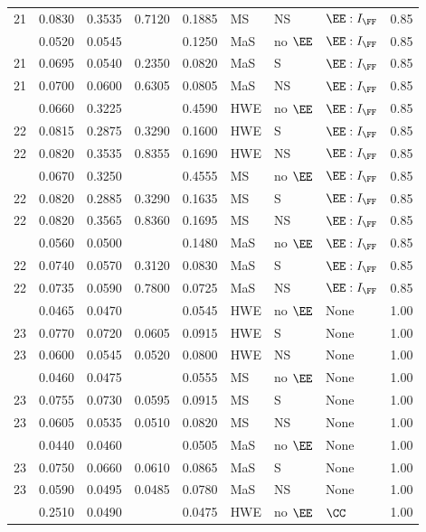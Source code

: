 \begin{longtable}[t]{lllllllll}
21 & 0.0830 & 0.3535 & 0.7120 & 0.1885 & MS & NS & $\EE:I_{\FF}$ & 0.85\\
\addlinespace
21 & 0.0520 & 0.0545 &  & 0.1250 & MaS & no $\EE$ & $\EE:I_{\FF}$ & 0.85\\
21 & 0.0695 & 0.0540 & 0.2350 & 0.0820 & MaS & S & $\EE:I_{\FF}$ & 0.85\\
21 & 0.0700 & 0.0600 & 0.6305 & 0.0805 & MaS & NS & $\EE:I_{\FF}$ & 0.85\\
\addlinespace
22 & 0.0660 & 0.3225 &  & 0.4590 & HWE & no $\EE$ & $\EE:I_{\FF}$ & 0.85\\
22 & 0.0815 & 0.2875 & 0.3290 & 0.1600 & HWE & S & $\EE:I_{\FF}$ & 0.85\\
22 & 0.0820 & 0.3535 & 0.8355 & 0.1690 & HWE & NS & $\EE:I_{\FF}$ & 0.85\\
\addlinespace
22 & 0.0670 & 0.3250 &  & 0.4555 & MS & no $\EE$ & $\EE:I_{\FF}$ & 0.85\\
22 & 0.0820 & 0.2885 & 0.3290 & 0.1635 & MS & S & $\EE:I_{\FF}$ & 0.85\\
22 & 0.0820 & 0.3565 & 0.8360 & 0.1695 & MS & NS & $\EE:I_{\FF}$ & 0.85\\
\addlinespace
22 & 0.0560 & 0.0500 &  & 0.1480 & MaS & no $\EE$ & $\EE:I_{\FF}$ & 0.85\\
22 & 0.0740 & 0.0570 & 0.3120 & 0.0830 & MaS & S & $\EE:I_{\FF}$ & 0.85\\
22 & 0.0735 & 0.0590 & 0.7800 & 0.0725 & MaS & NS & $\EE:I_{\FF}$ & 0.85\\
\addlinespace
23 & 0.0465 & 0.0470 &  & 0.0545 & HWE & no $\EE$ & None & 1.00\\
23 & 0.0770 & 0.0720 & 0.0605 & 0.0915 & HWE & S & None & 1.00\\
23 & 0.0600 & 0.0545 & 0.0520 & 0.0800 & HWE & NS & None & 1.00\\
\addlinespace
23 & 0.0460 & 0.0475 &  & 0.0555 & MS & no $\EE$ & None & 1.00\\
23 & 0.0755 & 0.0730 & 0.0595 & 0.0915 & MS & S & None & 1.00\\
23 & 0.0605 & 0.0535 & 0.0510 & 0.0820 & MS & NS & None & 1.00\\
\addlinespace
23 & 0.0440 & 0.0460 &  & 0.0505 & MaS & no $\EE$ & None & 1.00\\
23 & 0.0750 & 0.0660 & 0.0610 & 0.0865 & MaS & S & None & 1.00\\
23 & 0.0590 & 0.0495 & 0.0485 & 0.0780 & MaS & NS & None & 1.00\\
\addlinespace
24 & 0.2510 & 0.0490 &  & 0.0475 & HWE & no $\EE$ & $\CC$ & 1.00\\

\end{longtable}
